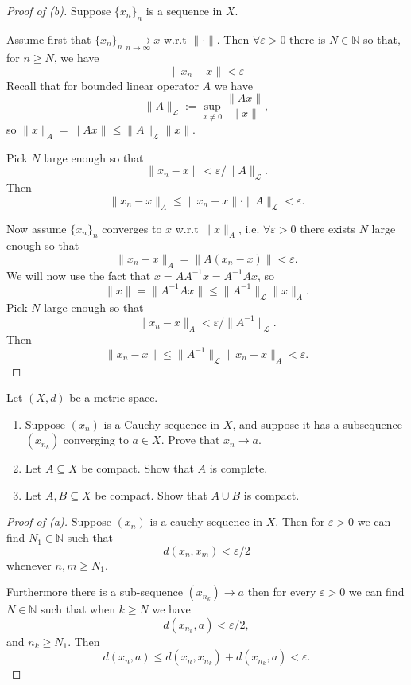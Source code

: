 \begin{proof}[Proof of (b)]
    Suppose $\{x_n\}_n$ is a sequence in $X$.

    Assume first that $\{x_n\}_n \underset{n\to\infty}{\to} x$ 
    w.r.t $\|\cdot\|$.
    Then $\forall \varepsilon > 0$ there is $N \in \mathbb N$ so that,
    for $n \geq N$, we have 
    \[
        \|x_n - x\| < \varepsilon
    \]
    Recall that for bounded linear operator $A$ we have 
    \[
        \|A\|_{\mathcal L} := \sup_{x \neq 0} \frac{\|Ax\|}{\|x\|},
    \]
    so $\|x\|_A = \|Ax\| \leq \|A\|_{\mathcal L}\|x\|$.

    Pick $N$ large enough so that 
    \[
        \|x_n - x\| < \varepsilon/\|A\|_{\mathcal L}.
    \]
    Then  
    \[
        \|x_n - x\|_A \leq 
        \|x_n - x\| \cdot \|A\|_{\mathcal L} < \varepsilon.
    \]

    Now assume $\{x_n\}_n$ converges to $x$ w.r.t $\|x\|_A$,
    i.e. $\forall \varepsilon > 0$ there exists 
    $N$ large enough so that 
    \[
        \|x_n - x\|_A = \|A(x_n - x)\| < \varepsilon. 
    \]
    We will now use the fact that 
    $x = AA^{-1}x = A^{-1}Ax$, so 
    \[
        \|x\| = \|A^{-1}Ax\| \leq 
        \|A^{-1}\|_{\mathcal L}\|x\|_A.
    \]
    Pick $N$ large enough so that 
    \[
        \|x_n - x\|_A < \varepsilon/\|A^{-1}\|_{\mathcal L}. 
    \]
    Then 
    \[
        \|x_n - x\| \leq \|A^{-1}\|_{\mathcal L} \|x_n-x\|_A < 
        \varepsilon.
    \]
\end{proof}

\begin{prob}[Problem 1]
Let $(X,d)$ be a metric space.

\begin{enumerate}[label=\alph*)]
    \item Suppose $(x_n)$ is a Cauchy sequence in $X$, and suppose it has a subsequence $(x_{n_k})$ converging to $a\in X$. Prove that $x_n\to a$.

    \item Let $A\subseteq X$ be compact. Show that $A$ is complete.

    \item Let $A,B\subseteq X$ be compact. Show that $A\cup B$ is compact.
\end{enumerate}
\end{prob}

\begin{proof}[Proof of (a)]
    Suppose $(x_n)$ is a cauchy sequence in $X$. Then 
    for $\varepsilon > 0$ we can find $N_1 \in \mathbb N$ 
    such that 
    \[
        d(x_n, x_m) < \varepsilon/2
    \]
    whenever $n,m \geq N_1$.
    
    Furthermore there is a sub-sequence $(x_{n_k}) \to a$ then 
    for every $\varepsilon > 0$ we can find $N \in \mathbb N$
    such that when $k \geq N$ we have  
    \[
        d(x_{n_k}, a) < \varepsilon/2, 
    \]
    and $n_k \geq N_1$. 
    Then 
    \[
        d(x_n, a) \leq 
        d(x_n, x_{n_k}) + d(x_{n_k}, a) < \varepsilon. 
    \]
\end{proof}


